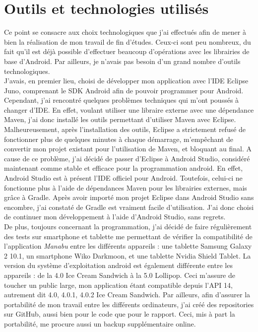\section{Outils et technologies utilisés}
Ce point se consacre aux choix technologiques que j'ai effectués afin de mener à bien la réalisation de mon travail de fin d'études. Ceux-ci sont peu nombreux, du fait qu'il est déjà possible d'effectuer beaucoup d'opérations avec les librairies de base d'Android. Par ailleurs, je n'avais pas besoin d'un grand nombre d'outils technologiques.\\

J'avais, en premier lieu, choisi de développer mon application avec l'IDE Eclipse Juno, comprenant le SDK Android afin de pouvoir programmer pour Android. Cependant, j'ai rencontré quelques problèmes techniques qui m'ont poussés à changer d'IDE. En effet, voulant utiliser une libraire externe avec une dépendance Maven, j'ai donc installé les outils permettant d'utiliser Maven avec Eclipse. Malheureusement, après l'installation des outils, Eclipse a strictement refusé de fonctionner plus de quelques minutes à chaque démarrage, m'empêchant de convertir mon projet existant pour l'utilisation de Maven, et bloquant au final. A cause de ce problème, j'ai décidé de passer d'Eclipse à Android Studio, considéré maintenant comme stable et efficace pour la programmation android. En effet, Android Studio est à présent l'IDE officiel pour Android. Toutefois, celui-ci ne fonctionne plus à l'aide de dépendances Maven pour les librairies externes, mais grâce à Gradle. Après avoir importé mon projet Eclipse dans Android Studio sans encombre, j'ai constaté de Gradle est vraiment facile d'utilisation. J'ai donc choisi de continuer mon développement à l'aide d'Android Studio, sans regrets.\\

De plus, toujours concernant la programmation, j'ai décidé de faire régulièrement des tests sur smartphone et tablette me permettant de vérifier la compatibilité de l'application \textit{Manabu} entre les différents appareils : une tablette Samsung Galaxy 2 10.1, un smartphone Wiko Darkmoon, et une tablette Nvidia Shield Tablet. La version du système d'exploitation android est également différente entre les appareils : de la 4.0 Ice Cream Sandwich à la 5.0 Lollipop. Ceci m'assure de toucher un public large, mon application étant compatible depuis l'API 14, autrement dit 4.0, 4.0.1, 4.0.2 Ice Cream Sandwich. Par ailleurs, afin d'assurer la portabilité de mon travail entre les différents ordinateurs, j'ai créé des repositories sur GitHub, aussi bien pour le code que pour le rapport. Ceci, mis à part la portabilité, me procure aussi un backup supplémentaire online.\\

